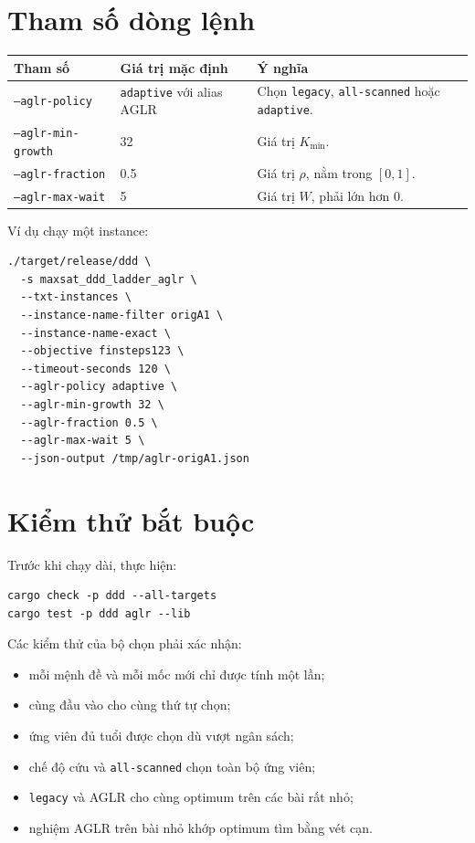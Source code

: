 \documentclass[11pt,a4paper]{article}
\newcommand{\code}[1]{\texttt{#1}}
\begin{document}
\section{Tham số dòng lệnh}

\begin{tabularx}{\textwidth}{@{}p{47mm}p{28mm}X@{}}
\toprule
Tham số & Giá trị mặc định & Ý nghĩa \\
\midrule
\code{--aglr-policy} & \code{adaptive} với alias AGLR &
Chọn \code{legacy}, \code{all-scanned} hoặc \code{adaptive}. \\
\code{--aglr-min-growth} & 32 & Giá trị $K_{\min}$. \\
\code{--aglr-fraction} & 0.5 & Giá trị $\rho$, nằm trong $[0,1]$. \\
\code{--aglr-max-wait} & 5 & Giá trị $W$, phải lớn hơn 0. \\
\bottomrule
\end{tabularx}

Ví dụ chạy một instance:

\begin{verbatim}
./target/release/ddd \
  -s maxsat_ddd_ladder_aglr \
  --txt-instances \
  --instance-name-filter origA1 \
  --instance-name-exact \
  --objective finsteps123 \
  --timeout-seconds 120 \
  --aglr-policy adaptive \
  --aglr-min-growth 32 \
  --aglr-fraction 0.5 \
  --aglr-max-wait 5 \
  --json-output /tmp/aglr-origA1.json
\end{verbatim}

\section{Kiểm thử bắt buộc}

Trước khi chạy dài, thực hiện:

\begin{verbatim}
cargo check -p ddd --all-targets
cargo test -p ddd aglr --lib
\end{verbatim}

Các kiểm thử của bộ chọn phải xác nhận:

\begin{itemize}
\item mỗi mệnh đề và mỗi mốc mới chỉ được tính một lần;
\item cùng đầu vào cho cùng thứ tự chọn;
\item ứng viên đủ tuổi được chọn dù vượt ngân sách;
\item chế độ cứu và \code{all-scanned} chọn toàn bộ ứng viên;
\item \code{legacy} và AGLR cho cùng optimum trên các bài rất nhỏ;
\item nghiệm AGLR trên bài nhỏ khớp optimum tìm bằng vét cạn.
\end{itemize}
\end{document}

